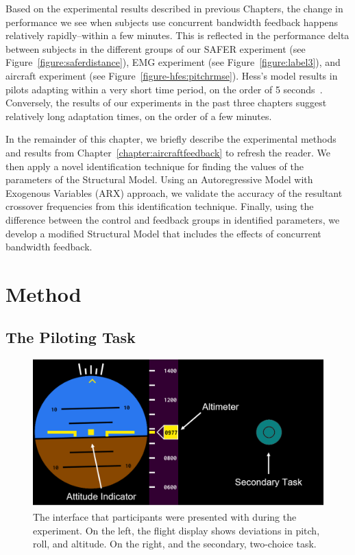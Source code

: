 Based on the experimental results described in previous Chapters, the change in performance we see when subjects use concurrent bandwidth feedback happens relatively rapidly--within a few minutes.
This is reflected in the performance delta between subjects in the different groups of our SAFER experiment (see Figure~\ref{figure:saferdistance}), EMG experiment (see Figure~\ref{figure:label3}), and aircraft experiment (see Figure~\ref{figure-hfes:pitchrmse}).
Hess's model results in pilots adapting within a very short time period, on the order of 5 seconds~\citep{weir_model_1966}.
Conversely, the results of our experiments in the past three chapters suggest relatively long adaptation times, on the order of a few minutes.

In the remainder of this chapter, we briefly describe the experimental methods and results from Chapter~\ref{chapter:aircraftfeedback} to refresh the reader.
We then apply a novel identification technique for finding the values of the parameters of the Structural Model.
Using an Autoregressive Model with Exogenous Variables (ARX) approach, we validate the accuracy of the resultant crossover frequencies from this identification technique.
Finally, using the difference between the control and feedback groups in identified parameters, we develop a modified Structural Model that includes the effects of concurrent bandwidth feedback.

\section{Method}

\subsection{The Piloting Task}

\begin{figure}[b]
    \centering
    \includegraphics[width=0.8\linewidth]{figures/Aircraft/image1.png}
    \caption[The interface]{The interface that participants were presented with during the experiment. On the left, the flight display shows deviations in pitch, roll, and altitude. On the right, and the secondary, two-choice task.}
    \label{fig:display}
\end{figure}

